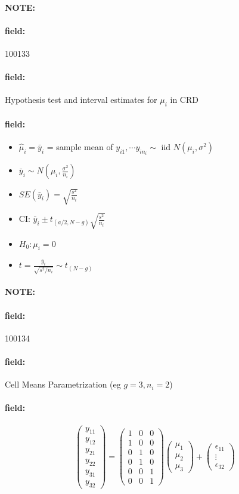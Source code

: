 \documentclass[12pt]{article}
\newenvironment{note}{\paragraph{NOTE:}}{}
\newenvironment{field}{\paragraph{field:}}{}
\begin{document}
\begin{note}
 \begin{field}
  \tiny 100133
 \end{field}
 \begin{field}
  Hypothesis test and interval estimates for $\mu_i$ in CRD
 \end{field}
 \begin{field}

   \begin{itemize}
     \item $\hat{\mu}_i = \bar{y}_i$ = sample mean of $y_{i1}, \cdots y_{in_{i}} \sim \text{ iid } N(\mu_i,\sigma^2)$
     \item $ \bar{y}_i \sim N(\mu_i, \frac{\sigma^2}{n_i})$
     \item $SE(\bar{y}_i) = \sqrt{\frac{s^2}{n_i}}$
     \item CI: $\bar{y}_i \pm t_{(a/2,N-g)} \sqrt{\frac{s^2}{n_i}}$
     \item $H_0: \mu_i = 0$
     \item $t = \frac{\bar{y}_i}{\sqrt{s^2/n_i}} \sim t_{(N-g)}$
   \end{itemize}
 \end{field}
\end{note}

\begin{note}
 \begin{field}
  \tiny 100134
 \end{field}
 \begin{field}
  Cell Means Parametrization
  (eg $g = 3, n_i = 2$)
 \end{field}
 \begin{field}
  $$ \begin{pmatrix}
    y_{11} \\ y_{12} \\ y_{21} \\ y_{22} \\ y_{31} \\y_{32}
   \end{pmatrix}  = \begin{pmatrix}
    1 & 0 & 0 \\
    1 & 0 & 0 \\
    0 & 1 & 0 \\
    0 & 1 & 0 \\
    0 & 0 & 1 \\
    0 & 0 & 1
   \end{pmatrix} \begin{pmatrix}
    \mu_{1} \\ \mu_2 \\ \mu_3
   \end{pmatrix} + \begin{pmatrix}
    \epsilon_{11} \\ \vdots \\ \epsilon_{32}
   \end{pmatrix}$$
 \end{field}
\end{note}
\end{document}
